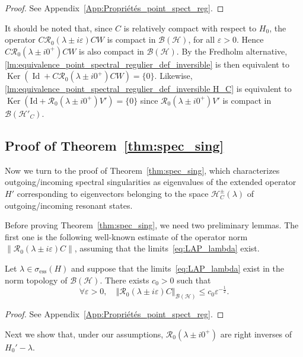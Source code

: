 \documentclass[AHL,Unicode,longabstracts,published]{cedram}
\newcommand{\Hi}{\mathcal{H}}
\newcommand{\ess}{\mathrm{ess}}
\newcommand{\norme}[1]{\left\Vert #1\right\Vert}
\newcommand{\Res}{\mathcal{R}}
\newcommand{\clB}{\mathcal{B}}
\DeclareMathOperator{\Ker}{Ker}
\DeclareMathOperator{\Id}{Id}
\let\oldforall\forall
\renewcommand*{\forall}{\mathrel{\oldforall}}
\newcommand{\Hi}{\mathcal{H}}
\newcommand{\ess}{\mathrm{ess}}
\begin{document}
\begin{proof}
See Appendix~\ref{App:Propriétés_point_spect_reg}.
\end{proof}

It should be noted that, since $C$ is relatively compact with respect to $H_0$, the operator $C\Res_0(\lambda\pm i\varepsilon)CW$ is compact in $\clB(\Hi)$, for all $\varepsilon>0$. Hence $C\Res_0(\lambda\pm i0^+)CW$ is also compact in $\clB(\Hi)$. By the Fredholm alternative, \eqref{lm:equivalence_point_spectral_regulier_def_inversible} is then equivalent to $\Ker(\Id+C\Res_0(\lambda\pm i0^+)CW)=\{0\}$. Likewise, \eqref{lm:equivalence_point_spectral_regulier_def_inversible H_C} is equivalent to $\Ker(\mathrm{Id}+\Res_0(\lambda\pm i0^+)V')=\{0\}$ since $\Res_0(\lambda\pm i0^+)V'$ is compact in $\clB(\Hi'_C)$.

\subsection{Proof of Theorem~\ref{thm:spec_sing}} \label{sec:proof_thm_spec_sing}

Now we turn to the proof of Theorem~\ref{thm:spec_sing}, which characterizes outgoing/incoming spectral singularities as eigenvalues of the extended operator $H'$ corresponding to eigenvectors belonging to the space $\Hi_C^\pm(\lambda)$ of outgoing/incoming resonant states.

Before proving Theorem~\ref{thm:spec_sing}, we need two preliminary lemmas. The first one is the following well-known estimate of the operator norm $\|\Res_0(\lambda\pm i\varepsilon)C\|$, assuming that the limits~\eqref{eq:LAP_lambda} exist.

\begin{lemm}\label{lm:tech_est}
Let $\lambda\in \sigma_\ess(H)$ and suppose that the limits~\eqref{eq:LAP_lambda} exist in the norm topology of $\clB(\Hi)$. There exists $c_0>0$ such that
\begin{equation}\label{eq:Estimé_norme_C_resolvante_H_0}
\forall \varepsilon>0, \quad \norme{\Res_0\left(\lambda\pm i\varepsilon\right)C}_\mathcal{\clB(\Hi)}\leq c_0\varepsilon^{-\frac12}.
\end{equation}
\end{lemm}

\begin{proof}
See Appendix~\ref{App:Propriétés_point_spect_reg}.
\end{proof}

Next we show that, under our assumptions, $\Res_0(\lambda\pm i0^+)$ are right inverses of $H_0'-\lambda$.
\end{document}
